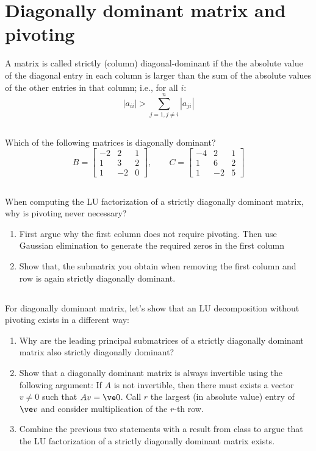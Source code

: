 \documentclass{article}%
\begin{document}
\section{Diagonally dominant matrix and pivoting}
A matrix is called strictly (column) diagonal-dominant if the
 the absolute value of the diagonal entry in each column is larger than
 the sum of the absolute values of the other entries in that
 column; i.e., for all $i$:
 $$
 |a_{ii}|>\sum_{j=1, j\not=i}^n |a_{ji}|
 $$
 
\subsection{}
Which of the following matrices is diagonally dominant?
$$
 B={\begin{bmatrix}-2&2&1\\1&3&2\\1&-2&0\end{bmatrix}}, \qquad
 C={\begin{bmatrix}-4&2&1\\1&6&2\\1&-2&5\end{bmatrix}}
$$

\subsection{}
When computing the LU
 factorization of a strictly diagonally dominant matrix, why is
 pivoting never necessary? 

\begin{enumerate}
    \item First argue why the first column does not require pivoting. Then use Gaussian elimination to generate the required zeros in the first column
    \item Show that, the submatrix you obtain when removing the first column and row is again strictly  diagonally dominant.
\end{enumerate}

\subsection{}
For diagonally dominant matrix, let's show that an LU decomposition without pivoting exists in a different way:
  \begin{enumerate}
    \item Why are the leading principal submatrices of a strictly
      diagonally dominant matrix also strictly diagonally dominant?
    \item Show that a diagonally dominant matrix is always invertible
      using the following argument: If $A$ is not invertible, then
      there must exists a vector $v\not=0$ such that
      $A v = \ve 0$. Call $r$ the largest (in
      absolute value) entry of $\ve v$ and consider
      multiplication of the $r$-th row. 
    \item Combine the previous two statements with a result from class
      to argue that the LU factorization of a strictly diagonally
      dominant matrix exists.
 \end{enumerate}
\end{document}
